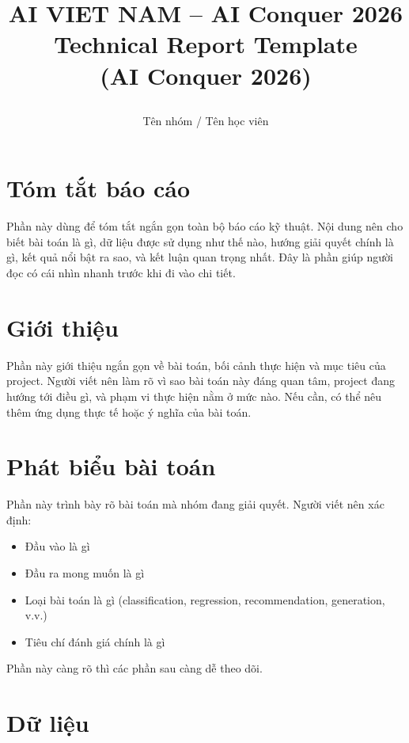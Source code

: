 \documentclass[12pt]{ai_conquer2026}
\title{%
  \begin{center}
        \Large {AI VIET NAM -- AI Conquer 2026}\\[.5ex]  
        \Huge \textbf{Technical Report Template \\ 
        (AI Conquer 2026)}\\[.5ex]
  \end{center}
}
\author{
        \begin{minipage}{\textwidth}
        \centering
        {
        \vspace{-1.5em}
          Tên nhóm / Tên học viên
        }\\
      \end{minipage}
    }
\date{}
\begin{document}
\maketitle
\vspace{-5.5em}
\setlength{\epigraphwidth}{0.6\textwidth}

\section{Tóm tắt báo cáo}

Phần này dùng để tóm tắt ngắn gọn toàn bộ báo cáo kỹ thuật. Nội dung nên cho biết bài toán là gì, dữ liệu được sử dụng như thế nào, hướng giải quyết chính là gì, kết quả nổi bật ra sao, và kết luận quan trọng nhất. Đây là phần giúp người đọc có cái nhìn nhanh trước khi đi vào chi tiết.

\newpage
\setcounter{tocdepth}{2}
\tableofcontents
\thispagestyle{fancy}

\newpage
\section{Giới thiệu}

Phần này giới thiệu ngắn gọn về bài toán, bối cảnh thực hiện và mục tiêu của project. Người viết nên làm rõ vì sao bài toán này đáng quan tâm, project đang hướng tới điều gì, và phạm vi thực hiện nằm ở mức nào. Nếu cần, có thể nêu thêm ứng dụng thực tế hoặc ý nghĩa của bài toán.

\section{Phát biểu bài toán}

Phần này trình bày rõ bài toán mà nhóm đang giải quyết. Người viết nên xác định:
\begin{itemize}
    \item Đầu vào là gì
    \item Đầu ra mong muốn là gì
    \item Loại bài toán là gì (classification, regression, recommendation, generation, v.v.)
    \item Tiêu chí đánh giá chính là gì
\end{itemize}

Phần này càng rõ thì các phần sau càng dễ theo dõi.

\section{Dữ liệu}
\end{document}
